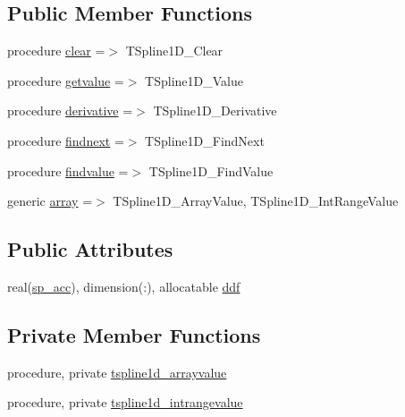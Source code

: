 \subsection*{Public Member Functions}
\begin{DoxyCompactItemize}
\item 
procedure \mbox{\hyperlink{structinterpolation_1_1tspline1d_a28c8ad7c5387f36a20181f39555b9416}{clear}} =$>$ T\+Spline1\+D\+\_\+\+Clear
\item 
procedure \mbox{\hyperlink{structinterpolation_1_1tspline1d_aa5035d18bcc149b86c515d9cf6dbdd6f}{getvalue}} =$>$ T\+Spline1\+D\+\_\+\+Value
\item 
procedure \mbox{\hyperlink{structinterpolation_1_1tspline1d_a4a820ba49b0484face14d4a43d1bbafd}{derivative}} =$>$ T\+Spline1\+D\+\_\+\+Derivative
\item 
procedure \mbox{\hyperlink{structinterpolation_1_1tspline1d_af388c24d061529adaf44d0aadd298d51}{findnext}} =$>$ T\+Spline1\+D\+\_\+\+Find\+Next
\item 
procedure \mbox{\hyperlink{structinterpolation_1_1tspline1d_a4ca9b4cbb7f99ce01adaa2dcd56ed109}{findvalue}} =$>$ T\+Spline1\+D\+\_\+\+Find\+Value
\item 
generic \mbox{\hyperlink{structinterpolation_1_1tspline1d_a58749b0ffdd7921d7102e4a5da1808c4}{array}} =$>$ T\+Spline1\+D\+\_\+\+Array\+Value, T\+Spline1\+D\+\_\+\+Int\+Range\+Value
\end{DoxyCompactItemize}
\subsection*{Public Attributes}
\begin{DoxyCompactItemize}
\item 
real(\mbox{\hyperlink{namespaceinterpolation_af72aa9a05feb8ef90b2d26e4a013abf3}{sp\+\_\+acc}}), dimension(\+:), allocatable \mbox{\hyperlink{structinterpolation_1_1tspline1d_a97ef592c4cdc2298f0ce07de2d842836}{ddf}}
\end{DoxyCompactItemize}
\subsection*{Private Member Functions}
\begin{DoxyCompactItemize}
\item 
procedure, private \mbox{\hyperlink{structinterpolation_1_1tspline1d_a8b94440d8dc8de8c120bb63a026cab7f}{tspline1d\+\_\+arrayvalue}}
\item 
procedure, private \mbox{\hyperlink{structinterpolation_1_1tspline1d_abb9d04ea35a39fd32fb3cfd25df7c6de}{tspline1d\+\_\+intrangevalue}}
\end{DoxyCompactItemize}


